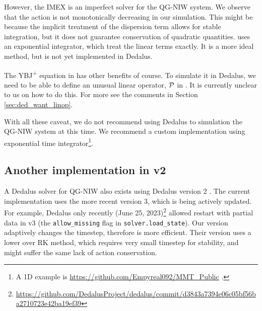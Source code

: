 However, the IMEX is an imperfect solver for the QG-NIW system. We observe that the action is not monotonically decreasing in our simulation. This might be because the implicit treatment of the dispersion term allows for stable integration, but it does not guarantee conservation of quadratic quantities. \cite{RochaEtAl_18} uses an exponential integrator, which treat the linear terms exactly. It is a more ideal method, but is not yet implemented in Dedalus.

The YBJ\textsuperscript{+} equation in \cite{AsselinYoung_19} has other benefits of course. To simulate it in Dedalus, we need to be able to define an unusual linear operator, $\mathcal{P}$ in \cite[(3.2)]{Xie_20}. It is currently unclear to us on how to do this. For more see the comments in Section  \ref{sec:ded_want_linop}.

With all these caveat, we do not recommend using Dedalus to simulation the QG-NIW system at this time. We recommend a custom implementation using exponential time integrator\footnote{A 1D example is \url{https://github.com/Empyreal092/MMT_Public} \parencite{DuBuhler_23}.}.

\subsection{Another implementation in v2}
A Dedalus solver for QG-NIW also exists using Dedalus version 2 \parencite{Conn_2023}. The current implementation uses the more recent version 3, which is being actively updated. For example, Dedalus only recently (June 25, 2023)\footnote{\url{https://github.com/DedalusProject/dedalus/commit/d3843a7394e06c05bf56ba2710723e42ba19ef39}\;} allowed restart with partial data in v3 (the \verb|allow_missing| flag in \verb|solver.load_state|). Our version adaptively changes the timestep, therefore is more efficient. Their version uses a lower over RK method, which requires very small timestep for stability, and might suffer the same lack of action conservation. 
